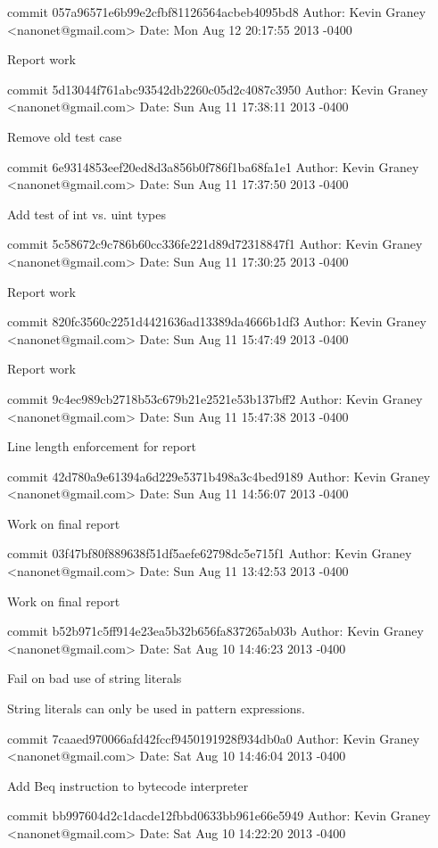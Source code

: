 commit 057a96571e6b99e2cfbf81126564acbeb4095bd8
Author: Kevin Graney <nanonet@gmail.com>
Date:   Mon Aug 12 20:17:55 2013 -0400

    Report work

commit 5d13044f761abc93542db2260c05d2c4087c3950
Author: Kevin Graney <nanonet@gmail.com>
Date:   Sun Aug 11 17:38:11 2013 -0400

    Remove old test case

commit 6e9314853eef20ed8d3a856b0f786f1ba68fa1e1
Author: Kevin Graney <nanonet@gmail.com>
Date:   Sun Aug 11 17:37:50 2013 -0400

    Add test of int vs. uint types

commit 5c58672c9c786b60cc336fe221d89d72318847f1
Author: Kevin Graney <nanonet@gmail.com>
Date:   Sun Aug 11 17:30:25 2013 -0400

    Report work

commit 820fc3560c2251d4421636ad13389da4666b1df3
Author: Kevin Graney <nanonet@gmail.com>
Date:   Sun Aug 11 15:47:49 2013 -0400

    Report work

commit 9c4ec989cb2718b53c679b21e2521e53b137bff2
Author: Kevin Graney <nanonet@gmail.com>
Date:   Sun Aug 11 15:47:38 2013 -0400

    Line length enforcement for report

commit 42d780a9e61394a6d229e5371b498a3c4bed9189
Author: Kevin Graney <nanonet@gmail.com>
Date:   Sun Aug 11 14:56:07 2013 -0400

    Work on final report

commit 03f47bf80f889638f51df5aefe62798dc5e715f1
Author: Kevin Graney <nanonet@gmail.com>
Date:   Sun Aug 11 13:42:53 2013 -0400

    Work on final report

commit b52b971c5ff914e23ea5b32b656fa837265ab03b
Author: Kevin Graney <nanonet@gmail.com>
Date:   Sat Aug 10 14:46:23 2013 -0400

    Fail on bad use of string literals
    
    String literals can only be used in pattern expressions.

commit 7caaed970066afd42fccf9450191928f934db0a0
Author: Kevin Graney <nanonet@gmail.com>
Date:   Sat Aug 10 14:46:04 2013 -0400

    Add Beq instruction to bytecode interpreter

commit bb997604d2c1dacde12fbbd0633bb961e66e5949
Author: Kevin Graney <nanonet@gmail.com>
Date:   Sat Aug 10 14:22:20 2013 -0400

